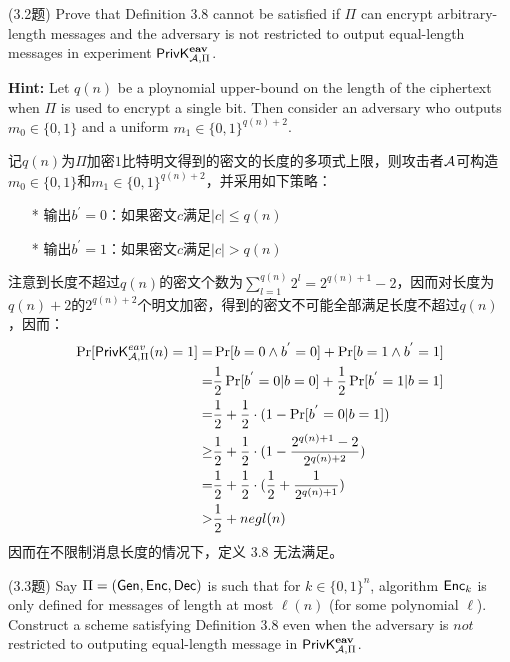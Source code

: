 \begin{questions}
    \question (3.2题) Prove that Definition 3.8 cannot be satisfied if $\Pi$ can encrypt arbitrary-length messages and the adversary is not restricted to output equal-length messages in experiment $\mathsf{PrivK}^{\textbf{eav}}_{\mathcal{A},\Pi}$.

        \textbf{Hint:} Let $q(n)$ be a ploynomial upper-bound on the length of the ciphertext when $\Pi$ is used to encrypt a single bit. Then consider an adversary who outputs $m_0\in\{0,1\}$ and a uniform $m_1\in\{0,1\}^{q(n)+2}$.

        \begin{solution}
            \newline
            记$q(n)$为$\Pi$加密$1$比特明文得到的密文的长度的多项式上限，则攻击者$\mathcal{A}$可构造$m_0\in\{0,1\}$和$m_1\in\{0,1\}^{q(n)+2}$，并采用如下策略：
            \begin{enumerate}
                \item[*] 输出${b}^{'}=0$：如果密文$c$满足$|c|\leq{q(n)}$
                \item[*] 输出${b}^{'}=1$：如果密文$c$满足$|c|>q(n)$
            \end{enumerate}
            注意到长度不超过$q(n)$的密文个数为$\sum_{l=1}^{q(n)}2^l=2^{q(n)+1}-2$，因而对长度为$q(n)+2$的$2^{q(n)+2}$个明文加密，得到的密文不可能全部满足长度不超过$q(n)$，因而：
            \begin{equation}
                \begin{aligned}
                    \Pr[\mathsf{PrivK}^{eav}_{\mathcal{A},\Pi}(n)=1]=&\Pr[b=0\wedge{b}^{'}=0]+\Pr[b=1\wedge{b}^{'}=1]\\
                    =&\frac{1}{2}\Pr[{b}^{'}=0|b=0]+\frac{1}{2}\Pr[{b}^{'}=1|b=1]\\
                    =&\frac{1}{2}+\frac{1}{2}\cdot(1-\Pr[{b}^{'}=0|b=1])\\
                    \geq&\frac{1}{2}+\frac{1}{2}\cdot(1-\frac{2^{q(n)+1}-2}{2^{q(n)+2}})\\
                    =&\frac{1}{2}+\frac{1}{2}\cdot(\frac{1}{2}+\frac{1}{2^{q(n)+1}})\\
                    >&\frac{1}{2}+negl(n)
                \end{aligned}
            \end{equation}
            因而在不限制消息长度的情况下，定义 3.8 无法满足。
        \end{solution}

    \question (3.3题) Say $\Pi=(\mathsf{Gen},\mathsf{Enc},\mathsf{Dec})$ is such that for $k\in\{0,1\}^n$, algorithm $\mathsf{Enc}_k$ is only defined for messages of length at most $\ell(n)$ (for some polynomial $\ell$). Construct a scheme satisfying Definition 3.8 even when the adversary is $not$ restricted to outputing equal-length message in $\mathsf{PrivK}^{\textbf{eav}}_{\mathcal{A},\Pi}$.


\end{questions}
